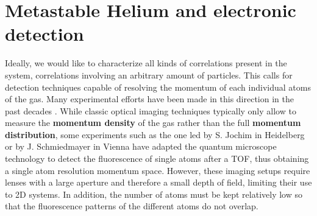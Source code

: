 \section*{Metastable Helium and electronic detection}

Ideally, we would like to characterize all kinds of correlations present in the system, \ie correlations involving an arbitrary amount of particles. This calls for detection techniques capable of resolving the momentum of each individual atoms of the gas. Many experimental efforts have been made in this direction in the past decades \cite{ott2016single}. While classic optical imaging techniques typically only allow to measure the \textbf{momentum density} of the gas rather than the full \textbf{momentum distribution}, some experiments such as the one led by S. Jochim in Heidelberg \cite{serwane2011deterministic} or by J. Schmiedmayer in Vienna \cite{bucker2009single} have adapted the quantum microscope technology to detect the fluorescence of single atoms after a TOF, thus obtaining a single atom resolution momentum space. However, these imaging setups require lenses with a large aperture and therefore a small depth of field, limiting their use to 2D systems. In addition, the number of atoms must be kept relatively low so that the fluorescence patterns of the different atoms do not overlap.

